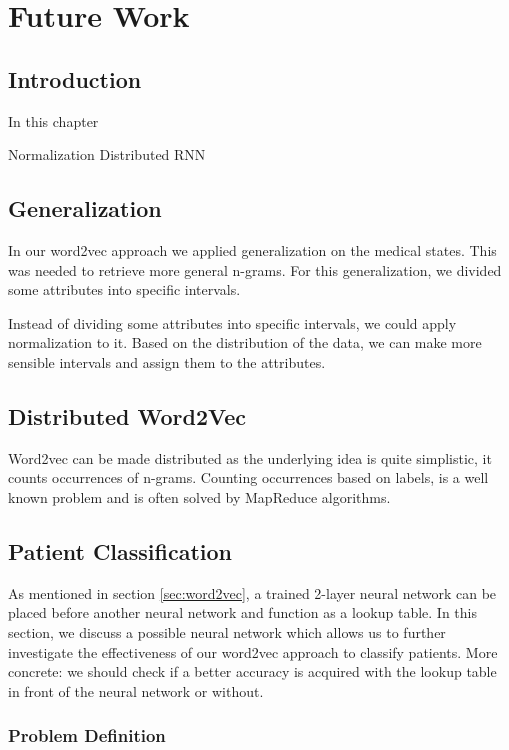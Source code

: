 \graphicspath{ {FutureWork/Images/} }


\chapter{Future Work}
\label{cha:futureWork}

\section{Introduction}
In this chapter 

Normalization
Distributed
RNN


\section{Generalization}

In our word2vec approach we applied generalization on the medical states. This was needed to retrieve more general n-grams. For this generalization, we divided some attributes into specific intervals.

Instead of dividing some attributes into specific intervals, we could apply normalization to it. Based on the distribution of the data, we can make more sensible intervals and assign them to the attributes.


\section{Distributed Word2Vec}

Word2vec can be made distributed as the underlying idea is quite simplistic, it counts occurrences of n-grams. Counting occurrences based on labels, is a well known problem and is often solved by MapReduce algorithms. 


\section{Patient Classification}
\label{sec:PatientClassification}

As mentioned in section \ref{sec:word2vec}, a trained 2-layer neural network can be placed before another neural network and function as a lookup table. In this section, we discuss a possible neural network which allows us to further investigate the effectiveness of our word2vec approach to classify patients. More concrete: we should check if a better accuracy is acquired with the lookup table in front of the neural network or without. 

\subsection{Problem Definition}

